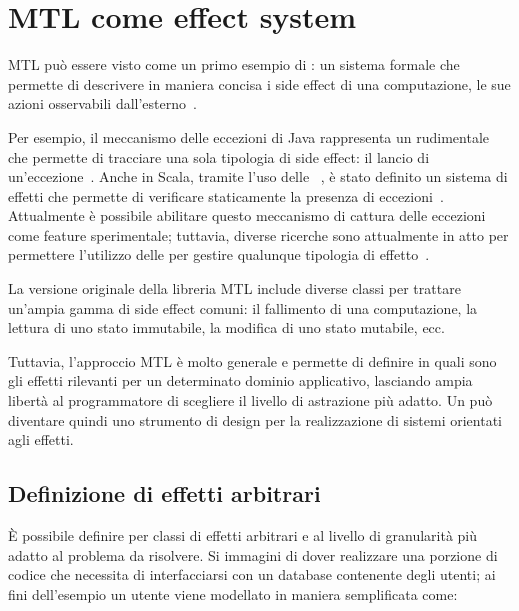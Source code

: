 \section{MTL come effect system}

MTL può essere visto come un primo esempio di : un sistema formale che permette di descrivere in maniera concisa i side effect di una computazione, le sue azioni osservabili dall'esterno~\cite[p.~943]{cit:design-concepts-in-programming-languages}.

Per esempio, il meccanismo delle eccezioni di Java rappresenta un rudimentale  che permette di tracciare una sola tipologia di side effect: il lancio di un'eccezione~\cite[p.~985]{cit:design-concepts-in-programming-languages}.
Anche in Scala, tramite l'uso delle ~\cite{cit:scala-3-reference-canthrow}, è stato definito un sistema di effetti che permette di verificare staticamente la presenza di eccezioni~\cite{cit:safer-exceptions-for-scala}. Attualmente è possibile abilitare questo meccanismo di cattura delle eccezioni come feature sperimentale; tuttavia, diverse ricerche sono attualmente in atto per permettere l'utilizzo delle  per gestire qualunque tipologia di effetto~\cite{cit:effects-capabilities-and-boxes-from-scope-based-reasoning-to-type-based-reasoning-and-back,cit:caprese}.

La versione originale della libreria MTL include diverse classi per trattare un'ampia gamma di side effect comuni: il fallimento di una computazione, la lettura di uno stato immutabile, la modifica di uno stato mutabile, ecc.

Tuttavia, l'approccio MTL è molto generale e permette di definire in  quali sono gli effetti rilevanti per un determinato dominio applicativo, lasciando ampia libertà al programmatore di scegliere il livello di astrazione più adatto.
Un  può diventare quindi uno strumento di design per la realizzazione di sistemi orientati agli effetti.

\subsection{Definizione di effetti arbitrari}
\label{sec:mtl-effetti-arbitrari}
È possibile definire  per classi di effetti arbitrari e al livello di granularità più adatto al problema da risolvere. Si immagini di dover realizzare una porzione di codice che necessita di interfacciarsi con un database contenente degli utenti; ai fini dell'esempio un utente viene modellato in maniera semplificata come:

